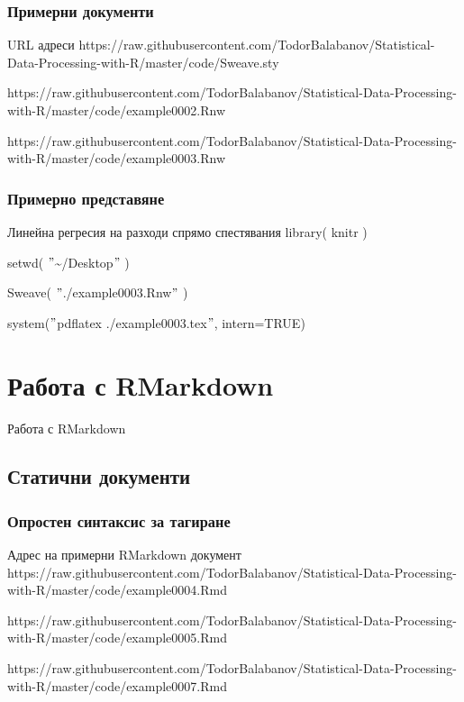 \documentclass{beamer}
\begin{document}
\begin{frame}
\frametitle{Примерни документи}
\begin{block}{URL адреси}
https://raw.githubusercontent.com/TodorBalabanov/Statistical-Data-Processing-with-R/master/code/Sweave.sty

https://raw.githubusercontent.com/TodorBalabanov/Statistical-Data-Processing-with-R/master/code/example0002.Rnw

https://raw.githubusercontent.com/TodorBalabanov/Statistical-Data-Processing-with-R/master/code/example0003.Rnw
\end{block}
\end{frame}

\begin{frame}
\frametitle{Примерно представяне}
\begin{block}{Линейна регресия на разходи спрямо спестявания}
library( knitr )

setwd( $"$\textasciitilde /Desktop$"$ )

Sweave( $"$./example0003.Rnw$"$ )

system($"$pdflatex ./example0003.tex$"$, intern=TRUE)
\end{block}
\end{frame}

\section{Работа с RMarkdown}

\begin{frame}
\center \huge{Работа с RMarkdown}
\end{frame}

\subsection{Статични документи}

\begin{frame}
\frametitle{Опростен синтаксис за тагиране}
\begin{block}{Адрес на примерни RMarkdown документ}
https://raw.githubusercontent.com/TodorBalabanov/Statistical-Data-Processing-with-R/master/code/example0004.Rmd

https://raw.githubusercontent.com/TodorBalabanov/Statistical-Data-Processing-with-R/master/code/example0005.Rmd

https://raw.githubusercontent.com/TodorBalabanov/Statistical-Data-Processing-with-R/master/code/example0007.Rmd
\end{block}
\end{frame}
\end{document}
